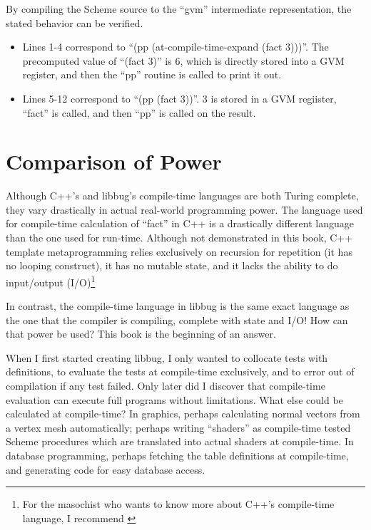  By compiling the Scheme source to the ``gvm'' intermediate
 representation, the stated behavior can be verified.


 \begin{itemize}
   \item
      Lines 1-4 correspond to ``(pp (at-compile-time-expand (fact 3)))''.  The precomputed
      value of ``(fact 3)'' is 6, which is directly stored into a GVM register, and
      then the ``pp'' routine is called to print it out.
   \item
      Lines 5-12 correspond to ``(pp (fact 3))''.  3 is stored in a GVM regiister, ``fact''
      is called, and then ``pp'' is called on the result.
 \end{itemize}

 \section{Comparison of Power}

 Although C++'s and libbug's compile-time languages are both Turing complete,
 they vary drastically in actual real-world programming power.  The language used
 for compile-time calculation of ``fact'' in C++ is a drastically different language than
 the one used for run-time.  Although not demonstrated in this book,
 C++ template metaprogramming relies exclusively on recursion for repetition (it has no
 looping construct), it has no mutable state, and it lacks the ability to do input/output
 (I/O)\footnote{For the masochist who wants to know more about C++'s compile-time language,
 I recommend \cite{ctm} }

 In contrast, the compile-time
 language in libbug is the same exact language as the one that the compiler
 is compiling, complete with state and I/O!  How can that power be used?
 This book is the beginning of an answer.


 When I first started creating libbug, I only wanted to collocate
 tests with definitions, to evaluate the tests at compile-time exclusively, and to error out
 of compilation
 if any test failed.  Only later did I discover that compile-time evaluation
 can execute full programs without limitations.  What else could be
 calculated at compile-time?  In graphics, perhaps calculating normal vectors
 from a vertex mesh automatically; perhaps writing ``shaders'' as compile-time
 tested Scheme procedures which are translated into actual shaders at compile-time.
 In database programming, perhaps fetching the table definitions at compile-time,
 and generating code for easy database access.


